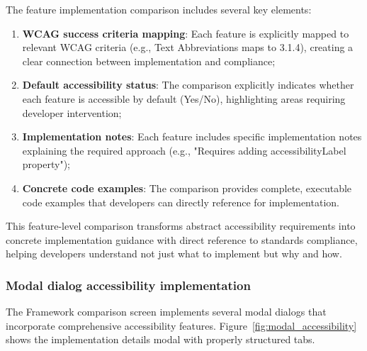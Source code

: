 \FloatBarrier

The feature implementation comparison includes several key elements:

\begin{enumerate}
    \item \textbf{WCAG success criteria mapping}: Each feature is explicitly mapped to relevant WCAG criteria (e.g., Text Abbreviations maps to 3.1.4), creating a clear connection between implementation and compliance;
    
    \item \textbf{Default accessibility status}: The comparison explicitly indicates whether each feature is accessible by default (Yes/No), highlighting areas requiring developer intervention;
    
    \item \textbf{Implementation notes}: Each feature includes specific implementation notes explaining the required approach (e.g., "Requires adding accessibilityLabel property");
    
    \item \textbf{Concrete code examples}: The comparison provides complete, executable code examples that developers can directly reference for implementation.
\end{enumerate}

This feature-level comparison transforms abstract accessibility requirements into concrete implementation guidance with direct reference to standards compliance, helping developers understand not just what to implement but why and how.

\subsubsection{Modal dialog accessibility implementation}

The Framework comparison screen implements several modal dialogs that incorporate comprehensive accessibility features. Figure~\ref{fig:modal_accessibility} shows the implementation details modal with properly structured tabs.

